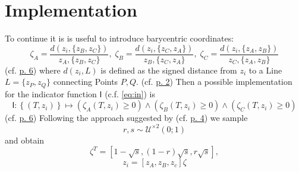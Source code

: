 \section{Implementation}
To continue it is is useful to introduce barycentric coordinates:
$$\zeta_A = \frac{d(z_i, \{z_B, z_C\})} {z_A, \{z_B, z_C\}}, \; 
\zeta_B = \frac{d(z_i, \{z_C, z_A\})} {z_B, \{z_C, z_A\}}, \;
\zeta_C = \frac{d(z_i, \{z_A, z_B\})} {z_C, \{z_A, z_B\}}$$
(cf.  \href{Burkardt-ComputationalGeometryLab-02-BarycentricCoordinatesinTriangles.pdf}{p. 6})
where $d(z_i, L)$ is defined as the signed distance from $z_i$ to a Line $L = \{z_P, z_Q\}$ connecting Points $P, Q$.
(cf.  \href{Burkardt-ComputationalGeometryLab-02-BarycentricCoordinatesinTriangles.pdf}{p. 2})
Then a possible implementation for the indicator function $\mathsf{I}$ (c.f. \ref{eq:in}) is
$$\mathsf{I}: \left\{(T, z_i)\right\} \mapsto (\zeta_A(T, z_i) \geq 0) \land (\zeta_B(T, z_i) \geq 0) \land (\zeta_C(T, z_i) \geq 0)$$
(cf.  \href{Burkardt-ComputationalGeometryLab-02-BarycentricCoordinatesinTriangles.pdf}{p. 6})
Following the approach suggested by 
(cf.  \href{Burkardt-ComputationalGeometryLab-03-MonteCarloOnTriangles.pdf}{p. 4})
we sample 
$$r, s \sim \mathcal{U}^{\times 2}(0; 1)$$
and obtain
$$\zeta^T = [1 - \sqrt{s}, (1 - r) \sqrt{s}, r \sqrt{s}], $$
$$z_i = [z_A, z_B, z_c] \zeta$$

